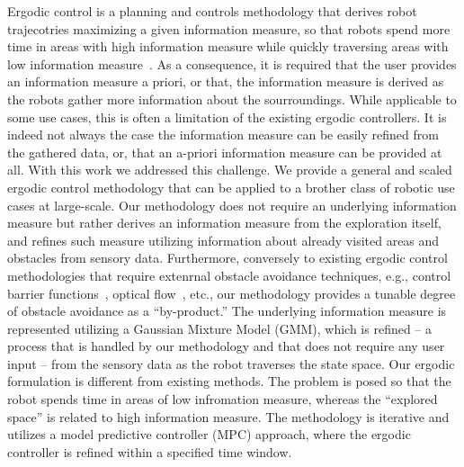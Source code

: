 \documentclass[letterpaper,10pt,conference,twoside]{IEEEtran}
\theoremstyle{definition}
\begin{document}
Ergodic control is a planning and controls methodology that derives robot trajecotries maximizing a given information measure, so that robots spend more time in areas with high information measure while quickly traversing areas with low information measure~\cite{mathew2011metrics,abraham2017ergodic,miller2013trajectory}. As a consequence, it is required that the user provides an information measure a priori, or that, the information measure is derived as the robots gather more information about the sourroundings. 
While applicable to some use cases, this is often a limitation of the existing ergodic controllers. It is indeed not always the case the information measure can be easily refined from the gathered data, or, that an a-priori information measure can be provided at all. With this work we addressed this challenge. We provide a general and scaled ergodic control methodology that can be applied to a brother class of robotic use cases at large-scale. Our methodology does not require an underlying information measure but rather derives an information measure from the exploration itself, and refines such measure utilizing information about already visited areas and obstacles from sensory data. 
Furthermore, conversely to existing ergodic control methodologies that require extenrnal obstacle avoidance techniques, e.g., control barrier functions~\cite{lerch2023safety}, optical flow~\cite{prabhakar2020ergodic}, etc., our methodology provides a tunable degree of obstacle avoidance as a ``by-product.'' 
%
The underlying information measure is represented utilizing a Gaussian Mixture Model (GMM), which is refined -- a process that is handled by our methodology and that does not require any user input -- from the sensory data as the robot traverses the state space. Our ergodic formulation is different from existing methods. The problem is posed so that the robot spends time in areas of low infromation measure, whereas the ``explored space'' is related to high information measure. 
The methodology is iterative and utilizes a model predictive controller (MPC) approach, where the ergodic controller is refined within a specified time window. 
\end{document}
